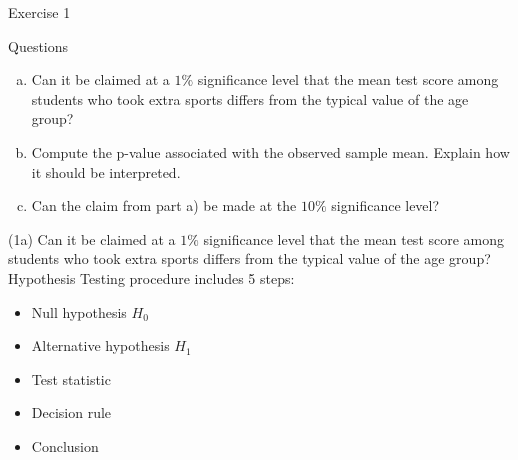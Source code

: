 \documentclass[
  11pt,
  ignorenonframetext,
]{beamer}
\providecommand{\tightlist}{%
  \setlength{\itemsep}{0pt}\setlength{\parskip}{0pt}}
\begin{document}
\begin{frame}{Exercise 1}
\protect\hypertarget{exercise-1-1}{}
\begin{block}{Questions}
\protect\hypertarget{questions}{}
\vspace{1mm}

\begin{enumerate}
[a)]
\tightlist
\item
  Can it be claimed at a \(1\%\) significance level that the mean test
  score among students who took extra sports differs from the typical
  value of the age group?
\end{enumerate}

\vspace{1mm}

\begin{enumerate}
[a)]
\setcounter{enumi}{1}
\tightlist
\item
  Compute the p-value associated with the observed sample mean. Explain
  how it should be interpreted.
\end{enumerate}

\vspace{1mm}

\begin{enumerate}
[a)]
\setcounter{enumi}{2}
\tightlist
\item
  Can the claim from part a) be made at the \(10\%\) significance level?
\end{enumerate}
\end{block}
\end{frame}

\begin{frame}{(1a) Can it be claimed at a \(1\%\) significance level
that the mean test score among students who took extra sports differs
from the typical value of the age group?}
\protect\hypertarget{a-can-it-be-claimed-at-a-1-significance-level-that-the-mean-test-score-among-students-who-took-extra-sports-differs-from-the-typical-value-of-the-age-group}{}
Hypothesis Testing procedure includes 5 steps:

\begin{itemize}
\tightlist
\item
  Null hypothesis \(H_0\)
\item
  Alternative hypothesis \(H_1\)
\item
  Test statistic
\item
  Decision rule
\item
  Conclusion
\end{itemize}
\end{frame}
\end{document}
